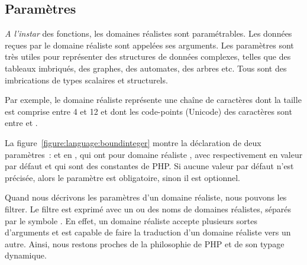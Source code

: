 \subsection{Paramètres}
\label{subsection:language:realdom:parameters}

{\em A l'instar} des fonctions, les domaines réalistes sont paramétrables. Les
données reçues par le domaine réaliste sont appelées ses {\strong arguments}.
Les paramètres sont très utiles pour représenter des structures de données
complexes, telles que des tableaux imbriqués, des graphes, des automates, des
arbres etc. Tous sont des imbrications de types scalaires et structurels.

\begin{example}

Par exemple, le domaine réaliste 
représente une chaîne de caractères dont la taille est comprise entre 4 et 12 et
dont les code-points (Unicode) des caractères sont entre  et
.

\end{example}

\noindent La figure~\ref{figure:language:boundinteger} montre la déclaration de
deux paramètres~:  et  en , qui ont pour
domaine réaliste , avec respectivement en valeur par défaut
 et  qui sont des constantes de PHP. Si
aucune valeur par défaut n'est précisée, alors le paramètre est obligatoire,
sinon il est optionnel.

Quand nous décrivons les paramètres d'un domaine réaliste, nous pouvons les
filtrer. Le filtre est exprimé avec un ou des noms de domaines réalistes,
séparés par le symbole \code{$\vert$}. En effet, un domaine réaliste accepte
plusieurs sortes d'arguments et est capable de faire la traduction d'un domaine
réaliste vers un autre. Ainsi, nous restons proches de la philosophie de PHP et
de son typage dynamique. 

